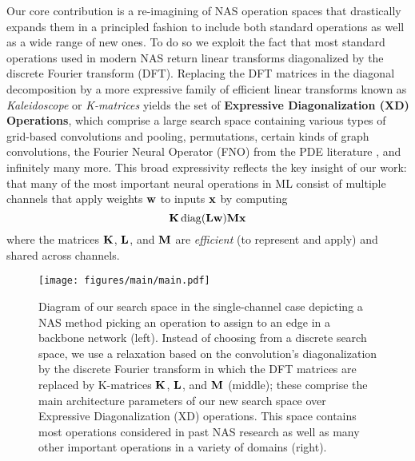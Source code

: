 Our core contribution is a re-imagining of NAS operation spaces that drastically expands them in a principled fashion to include both standard operations as well as a wide range of new ones. 
To do so we exploit the fact that most standard operations used in modern NAS return linear transforms diagonalized by the discrete Fourier transform (DFT). Replacing the DFT matrices in the diagonal decomposition by a more expressive family of efficient linear transforms known as {\em Kaleidoscope} or {\em K-matrices} \citep{dao2020kaleidoscope} yields the set of {\bf Expressive Diagonalization (XD) Operations}, which comprise a large search space containing various types of grid-based convolutions and pooling, permutations, certain kinds of graph convolutions, the Fourier Neural Operator (FNO) from the PDE literature \citep{li2021fno}, and infinitely many more.
This broad expressivity reflects the key insight of our work:
that many of the most important neural operations in ML consist of multiple channels that apply weights $\mathbf{w}$ to inputs $\mathbf{x}$ by computing
\begin{equation}
\mathbf{K}\operatorname{\operatorname{diag}}(\mathbf{L}\mathbf{w})\mathbf{M}\mathbf{x}
\end{equation}
where the matrices $\mathbf{K}$, $\mathbf{L}$, and $\mathbf{M}$ are {\em efficient} (to represent and apply) and shared across channels.

\begin{figure*}[ht!]
	\centering
		\texttt{[image: figures/main/main.pdf]}
	\caption{\label{fig:main}
		Diagram of our search space in the single-channel case depicting a NAS method picking an operation to assign to an edge in a backbone network (left).
		Instead of choosing from a discrete search space, we use a relaxation based on the convolution's diagonalization by the discrete Fourier transform in which the DFT matrices are replaced by K-matrices \citep{dao2020kaleidoscope} $\mathbf{K}$, $\mathbf{L}$, and $\mathbf{M}$ (middle);
		these comprise the main architecture parameters of our new search space over Expressive Diagonalization (XD) operations.
		This space contains most operations considered in past NAS research as well as many other important operations in a variety of domains (right).
	}
\end{figure*}

